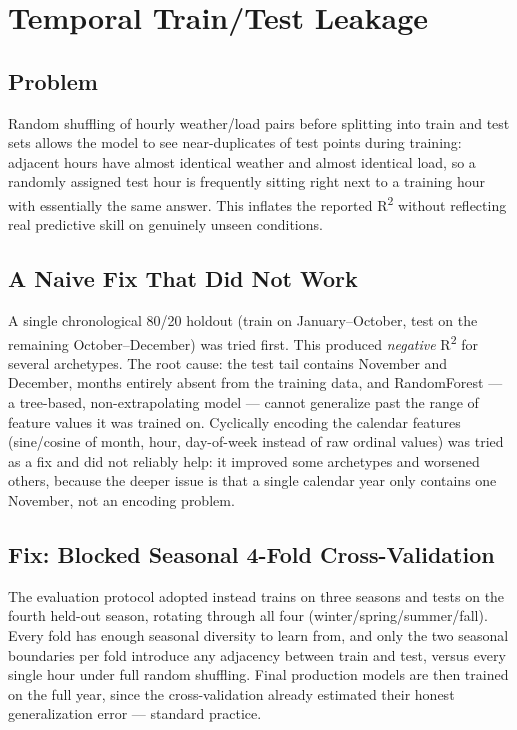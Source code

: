 \documentclass[11pt]{article}
\begin{document}
\section{Temporal Train/Test Leakage}
\label{sec:temporal}

\subsection{Problem}

Random shuffling of hourly weather/load pairs before splitting into train and test
sets allows the model to see near-duplicates of test points during training: adjacent
hours have almost identical weather and almost identical load, so a randomly assigned
test hour is frequently sitting right next to a training hour with essentially the
same answer. This inflates the reported R\textsuperscript{2} without reflecting real
predictive skill on genuinely unseen conditions.

\subsection{A Naive Fix That Did Not Work}

A single chronological 80/20 holdout (train on January--October, test on the
remaining October--December) was tried first. This produced \emph{negative}
R\textsuperscript{2} for several archetypes. The root cause: the test tail contains
November and December, months entirely absent from the training data, and
RandomForest --- a tree-based, non-extrapolating model --- cannot generalize past the
range of feature values it was trained on. Cyclically encoding the calendar features
(sine/cosine of month, hour, day-of-week instead of raw ordinal values) was tried as a
fix and did not reliably help: it improved some archetypes and worsened others,
because the deeper issue is that a single calendar year only contains one November,
not an encoding problem.

\subsection{Fix: Blocked Seasonal 4-Fold Cross-Validation}

The evaluation protocol adopted instead trains on three seasons and tests on the
fourth held-out season, rotating through all four (winter/spring/summer/fall). Every
fold has enough seasonal diversity to learn from, and only the two seasonal
boundaries per fold introduce any adjacency between train and test, versus every
single hour under full random shuffling. Final production models are then trained on
the full year, since the cross-validation already estimated their honest
generalization error --- standard practice.
\end{document}
